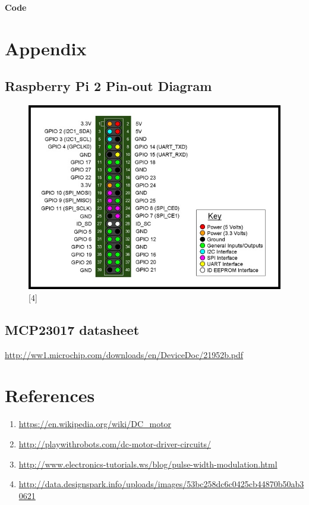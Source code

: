 \documentclass[11pt,a4paper]{article}
\begin{document}
	\newpage 
	\textbf{Code}
	\vspace{0.3cm}
	
	
	
	\newpage
	\section{Appendix}
	
	\subsection{Raspberry Pi 2 Pin-out Diagram}
	\begin{figure}[h!]
		\includegraphics[scale=0.6]{RaspberryPi2_pinout.jpg}
		\centering
		\caption{[4]}
	\end{figure}
	
	\subsection{MCP23017 datasheet}
	
	\url{http://ww1.microchip.com/downloads/en/DeviceDoc/21952b.pdf}
	
	\section{References}
	\begin{enumerate}
		\item \url{https://en.wikipedia.org/wiki/DC_motor}
		\item \url{http://playwithrobots.com/dc-motor-driver-circuits/}
		\item \url{http://www.electronics-tutorials.ws/blog/pulse-width-modulation.html}
		\item \url{http://data.designspark.info/uploads/images/53bc258dc6c0425cb44870b50ab30621}
	\end{enumerate}
	
\end{document}
